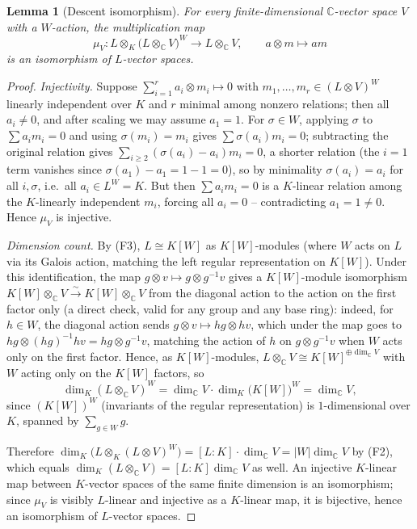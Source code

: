 \documentclass[11pt,a4paper]{article}
\newtheorem{lemma}[theorem]{Lemma}
\begin{document}
\begin{lemma}[Descent isomorphism]\label{lem:descent-iso}
For every finite-dimensional $\mathbb{C}$-vector space $V$ with a
$W$-action, the multiplication map
\[
  \mu_V : L \otimes_K \big(L \otimes_{\mathbb{C}} V\big)^{W} \longrightarrow L \otimes_{\mathbb{C}} V,
  \qquad a \otimes m \longmapsto am
\]
is an isomorphism of $L$-vector spaces.
\end{lemma}

\begin{proof}
\emph{Injectivity.} Suppose $\sum_{i=1}^r a_i \otimes m_i \mapsto 0$
with $m_1,\dots,m_r \in (L\otimes V)^W$ linearly independent over $K$
and $r$ minimal among nonzero relations; then all $a_i \ne 0$, and
after scaling we may assume $a_1 = 1$. For $\sigma \in W$, applying
$\sigma$ to $\sum a_i m_i = 0$ and using $\sigma(m_i) = m_i$ gives
$\sum \sigma(a_i) m_i = 0$; subtracting the original relation gives
$\sum_{i \ge 2} (\sigma(a_i) - a_i) m_i = 0$, a shorter relation
(the $i=1$ term vanishes since $\sigma(a_1)-a_1=1-1=0$), so by
minimality $\sigma(a_i) = a_i$ for all $i,\sigma$, i.e.\ all
$a_i \in L^W = K$. But then $\sum a_i m_i = 0$ is a $K$-linear
relation among the $K$-linearly independent $m_i$, forcing all
$a_i = 0$ -- contradicting $a_1 = 1 \ne 0$. Hence $\mu_V$ is
injective.

\emph{Dimension count.} By (F3), $L \cong K[W]$ as $K[W]$-modules
(where $W$ acts on $L$ via its Galois action, matching the left
regular representation on $K[W]$). Under this identification, the map
$g \otimes v \mapsto g \otimes g^{-1}v$ gives a $K[W]$-module
isomorphism $K[W] \otimes_{\mathbb{C}} V \xrightarrow{\sim} K[W] \otimes_{\mathbb{C}} V$
from the diagonal action to the action on the first factor only (a
direct check, valid for any group and any base ring): indeed, for
$h \in W$, the diagonal action sends
$g \otimes v \mapsto hg \otimes hv$, which under the map goes to
$hg \otimes (hg)^{-1}hv = hg \otimes g^{-1}v$, matching the action of
$h$ on $g \otimes g^{-1}v$ when $W$ acts only on the first factor.
Hence, as $K[W]$-modules,
$L \otimes_{\mathbb{C}} V \cong K[W]^{\oplus \dim_{\mathbb{C}} V}$ with
$W$ acting only on the $K[W]$ factors, so
\[
  \dim_K (L \otimes_{\mathbb{C}} V)^W
  = \dim_{\mathbb{C}} V \cdot \dim_K \big(K[W]\big)^W
  = \dim_{\mathbb{C}} V,
\]
since $(K[W])^W$ (invariants of the regular representation) is
$1$-dimensional over $K$, spanned by $\sum_{g \in W} g$.

Therefore
$\dim_K\big(L \otimes_K (L\otimes V)^W\big) = [L:K]\cdot\dim_{\mathbb{C}}V
= |W|\dim_{\mathbb{C}}V$ by (F2), which equals
$\dim_K(L\otimes_{\mathbb{C}}V) = [L:K]\dim_{\mathbb{C}}V$ as well.
An injective $K$-linear map between $K$-vector spaces of the same
finite dimension is an isomorphism; since $\mu_V$ is visibly
$L$-linear and injective as a $K$-linear map, it is bijective, hence
an isomorphism of $L$-vector spaces.
\end{proof}
\end{document}
